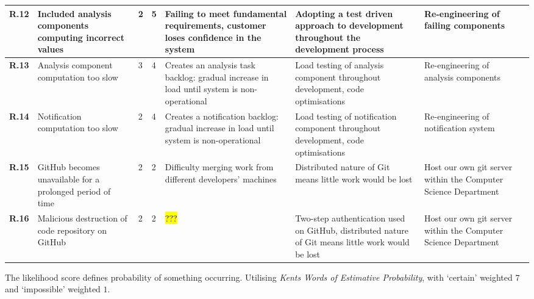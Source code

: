 \begin{longtable}[H]{| p{0.65cm} | p{2cm} | p{0.3cm} | p{0.3cm} | p{2.4cm} | p{3cm} | p{2.7cm} | p{0.4cm} |}
  \hline \textbf{R.12}
  & Included analysis components computing incorrect values
  & 2
  & 5
  & Failing to meet fundamental requirements, customer loses confidence in the system
  & Adopting a test driven approach to development throughout the development process
  & Re-engineering of failing components
  & \\
  
  \hline \textbf{R.13}
  & Analysis component computation too slow
  & 3
  & 4
  & Creates an analysis task backlog: gradual increase in load until system
  is non-operational
  & Load testing of analysis component throughout development, code optimisations 
  & Re-engineering of analysis components
  & \\  
  
  \hline \textbf{R.14}
  & Notification computation too slow
  & 2
  & 4
  & Creates a notification backlog: gradual increase in load until system
  is non-operational
  & Load testing of notification component throughout development, code optimisations 
  & Re-engineering of notification system
  & \\
  
  \hline \textbf{R.15}
  & GitHub becomes unavailable for a prolonged period of time
  & 2
  & 2
  & Difficulty merging work from different developers' machines
  & Distributed nature of Git means little work would be lost
  & Host our own git server within the Computer Science Department
  & \\ 
  
  \hline \textbf{R.16}
  & Malicious destruction of code repository on GitHub
  & 2
  & 2
  & \hl{???}
  & Two-step authentication used on GitHub, distributed nature of Git means little work would be lost
  & Host our own git server within the Computer Science Department
  & \\    
    
  \hline
\end{longtable}       

The likelihood score defines probability of something occurring. Utilising
\textit{Kents Words of Estimative Probability}\cite{kent1966strategic}, with
`certain' weighted $7$ and `impossible' weighted $1$.

